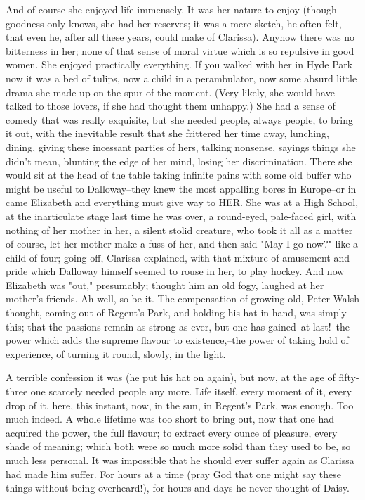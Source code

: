 \documentclass[lang=cn,10pt]{elegantbook}
\begin{document}
And of course she enjoyed life immensely.  It was her nature to
enjoy (though goodness only knows, she had her reserves; it was a
mere sketch, he often felt, that even he, after all these years,
could make of Clarissa).  Anyhow there was no bitterness in her;
none of that sense of moral virtue which is so repulsive in good
women.  She enjoyed practically everything.  If you walked with her
in Hyde Park now it was a bed of tulips, now a child in a
perambulator, now some absurd little drama she made up on the spur
of the moment.  (Very likely, she would have talked to those
lovers, if she had thought them unhappy.)  She had a sense of
comedy that was really exquisite, but she needed people, always
people, to bring it out, with the inevitable result that she
frittered her time away, lunching, dining, giving these incessant
parties of hers, talking nonsense, sayings things she didn't mean,
blunting the edge of her mind, losing her discrimination.  There
she would sit at the head of the table taking infinite pains with
some old buffer who might be useful to Dalloway--they knew the most
appalling bores in Europe--or in came Elizabeth and everything must
give way to HER.  She was at a High School, at the inarticulate
stage last time he was over, a round-eyed, pale-faced girl, with
nothing of her mother in her, a silent stolid creature, who took it
all as a matter of course, let her mother make a fuss of her, and
then said "May I go now?" like a child of four; going off, Clarissa
explained, with that mixture of amusement and pride which Dalloway
himself seemed to rouse in her, to play hockey.  And now Elizabeth
was "out," presumably; thought him an old fogy, laughed at her
mother's friends.  Ah well, so be it.  The compensation of growing
old, Peter Walsh thought, coming out of Regent's Park, and holding
his hat in hand, was simply this; that the passions remain as
strong as ever, but one has gained--at last!--the power which adds
the supreme flavour to existence,--the power of taking hold of
experience, of turning it round, slowly, in the light.

A terrible confession it was (he put his hat on again), but now, at
the age of fifty-three one scarcely needed people any more.  Life
itself, every moment of it, every drop of it, here, this instant,
now, in the sun, in Regent's Park, was enough.  Too much indeed.  A
whole lifetime was too short to bring out, now that one had
acquired the power, the full flavour; to extract every ounce of
pleasure, every shade of meaning; which both were so much more
solid than they used to be, so much less personal.  It was
impossible that he should ever suffer again as Clarissa had made
him suffer.  For hours at a time (pray God that one might say these
things without being overheard!), for hours and days he never
thought of Daisy.
\end{document}
